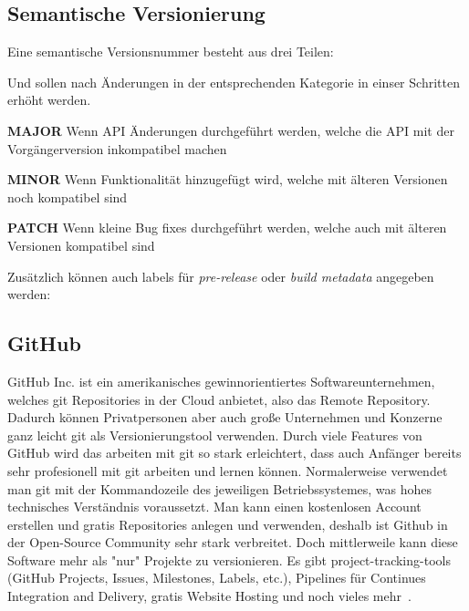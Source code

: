 \cite{git-workflow}

\subsection{Semantische Versionierung}
\label{subsec:semantic-versioning}
Eine semantische Versionsnummer besteht aus drei Teilen:

\begin{center}
\end{center}

Und sollen nach Änderungen in der entsprechenden Kategorie in einser Schritten erhöht werden.

\textbf{MAJOR}
Wenn API Änderungen durchgeführt werden, welche die API mit der Vorgängerversion inkompatibel machen
\linebreak

\textbf{MINOR}
Wenn Funktionalität hinzugefügt wird, welche mit älteren Versionen noch kompatibel sind
\linebreak

\textbf{PATCH}
Wenn kleine Bug fixes durchgeführt werden, welche auch mit älteren Versionen kompatibel sind
\linebreak

Zusätzlich können auch labels für \emph{pre-release} oder \emph{build metadata} angegeben werden:

\begin{center}
\end{center}

\cite{semantische-versionierung}

\subsection{GitHub}\label{subsec:github}
GitHub Inc. ist ein amerikanisches gewinnorientiertes Softwareunternehmen, welches git Repositories in der Cloud anbietet,
also das Remote Repository.
Dadurch können Privatpersonen aber auch große Unternehmen und Konzerne ganz leicht git als Versionierungstool verwenden.
Durch viele Features von GitHub wird das arbeiten mit git so stark erleichtert, dass auch Anfänger bereits sehr profesionell
mit git arbeiten und lernen können.
Normalerweise verwendet man git mit der Kommandozeile des jeweiligen Betriebssystemes, was hohes technisches Verständnis voraussetzt.
Man kann einen kostenlosen Account erstellen und gratis Repositories anlegen und verwenden,
deshalb ist Github in der Open-Source Community sehr stark verbreitet.
Doch mittlerweile kann diese Software mehr als "nur" Projekte zu versionieren.
Es gibt project-tracking-tools (GitHub Projects, Issues, Milestones, Labels, etc.), Pipelines für Continues Integration and Delivery,
gratis Website Hosting und noch vieles mehr~\cite{github-features}.


